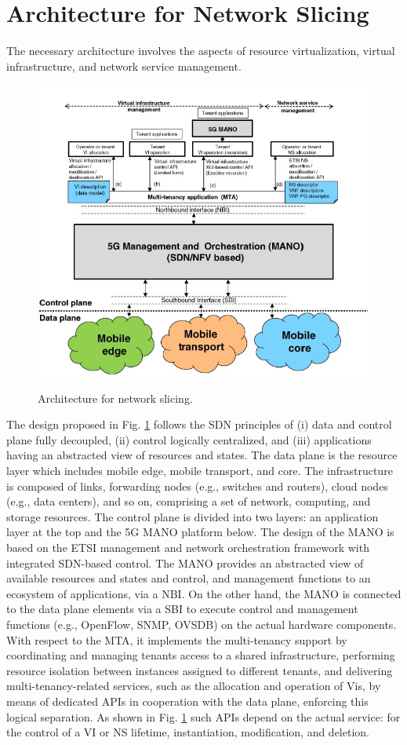 \documentclass{article}
\begin{document}
\section{Architecture for Network Slicing}
The necessary architecture involves the aspects of resource virtualization, virtual infrastructure, and network service management.
\begin{figure}[h]
\centering
\includegraphics[scale=0.67]{pics/2.JPG}
\label{Arch}
\caption{Architecture for network slicing.} 
\end{figure}
The design proposed in Fig. \ref{Arch} follows the SDN principles of
(i) data and control plane fully decoupled, (ii) control logically centralized, and (iii) applications having an abstracted view of resources and states.
The data plane is the resource layer which includes mobile edge, mobile transport, and core. The infrastructure is composed of links, forwarding nodes (e.g., switches and routers), cloud nodes (e.g., data centers), and so on, comprising a set of network, computing, and storage resources.
The control plane is divided into two layers: an application layer at the top and the 5G \gls{MANO} platform below. The design
of the MANO is based on the ETSI management and network orchestration framework with integrated SDN-based control. The MANO
provides an abstracted view of available resources and states and control, and
management functions to an ecosystem of applications, via a \gls{NBI}. On the other hand, the MANO is connected to the data plane
elements via a \gls{SBI} to execute control and management
functions (e.g., OpenFlow, SNMP, OVSDB) on the actual hardware components.
With respect to the \gls{MTA}, it implements the
multi-tenancy support by coordinating and managing tenants access to a shared
infrastructure, performing resource isolation between instances assigned to
different tenants, and delivering multi-tenancy-related services, such as the
allocation and operation of Vis, by means of dedicated APIs in cooperation
with the data plane, enforcing this logical separation. As shown in Fig. \ref{Arch}
such APIs depend on the actual service: for the control of a VI or NS lifetime,
instantiation, modification, and deletion.
\end{document}
